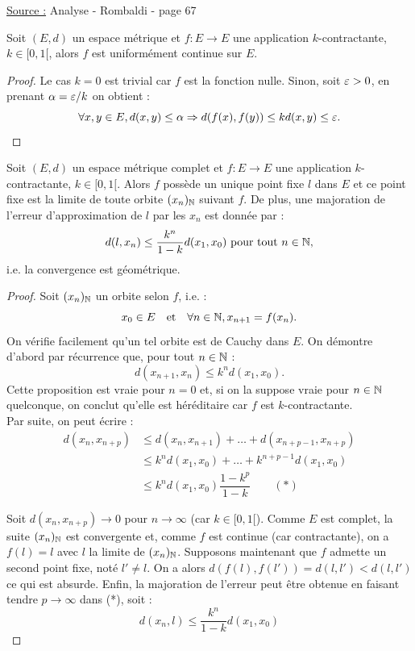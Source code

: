 

\pagestyle{fancy}

\fancyhead[R]{}



\underline{Source :} Analyse - Rombaldi - page 67

\begin{lem}
Soit $(E,d)$ un espace métrique et $f:E \to E$ une application $k$-contractante, $k \in [0,1[$, 
alors $f$ est uniformément continue sur $E$.
\end{lem}

\begin{proof}
Le cas $k=0$ est trivial car $f$ est la fonction nulle. 
Sinon, soit $\varepsilon > 0$, en prenant $\alpha = \varepsilon / k$ on obtient :
\[ \forall x, y \in E, d(x, y) \leq \alpha \Rightarrow d(f(x), f(y)) \leq k d(x,y) \leq \varepsilon . \]
\end{proof}

\begin{thm}
Soit $(E,d)$ un espace métrique complet et $f:E \to E$ une application $k$-contractante, $k \in [0,1[$. 
Alors $f$ possède un unique point fixe $l$ dans $E$ et ce point fixe est la limite de toute orbite $(x_n)_{\mathbb{N}}$ suivant $f$. 
De plus, une majoration de l'erreur d'approximation de $l$ par les $x_n$ est donnée par :
\[ d(l, x_n) \leq \dfrac{k^n}{1-k} d(x_1, x_0) \text{ pour tout } n \in \mathbb{N} , \] 
i.e. la convergence est géométrique.
\end{thm}

\begin{proof}
Soit $(x_n)_{\mathbb{N}}$ un orbite selon $f$, i.e. :
\[ x_0 \in E \quad \text{et} \quad \forall n \in \mathbb{N}, x_{n+1} = f(x_n) . \]
On vérifie facilement qu'un tel orbite est de Cauchy dans $E$.
On démontre d'abord par récurrence que, pour tout $n \in \mathbb{N}$ :
\[ d(x_{n+1}, x_n) \leq k^n d(x_1, x_0) . \]
Cette proposition est vraie pour $n = 0$ et, si on la suppose vraie pour $n \in \mathbb{N}$ quelconque, 
on conclut qu'elle est héréditaire car $f$ est $k$-contractante. \\

Par suite, on peut écrire :
\begin{align*}
d(x_n, x_{n+p}) & \leq d(x_n, x_{n+1}) + \dots + d(x_{n+p-1}, x_{n+p}) \\ 
& \leq k^n d(x_1, x_0) + \dots + k^{n+p-1} d(x_1, x_0) \\
& \leq k^n d(x_1, x_0) \dfrac{1-k^p}{1-k} \qquad (*)
\end{align*}

Soit $d(x_n, x_{n+p}) \to 0$ pour $n \to \infty$ (car $k \in [0,1[$). Comme $E$ est complet, la suite $(x_n)_{\mathbb{N}}$ est convergente et, 
comme $f$ est continue (car contractante), on a $f(l) = l$ avec $l$ la limite de $(x_n)_{\mathbb{N}}$.
Supposons maintenant que $f$ admette un second point fixe, noté $l' \neq l$. On a alors $d(f(l), f(l')) = d(l,l') < d(l, l')$ ce qui est absurde.
Enfin, la majoration de l'erreur peut être obtenue en faisant tendre $p \to \infty$ dans (*), soit :
\[ d(x_n, l) \leq \dfrac{k^n}{1-k} d(x_1, x_0) \]

\end{proof}
